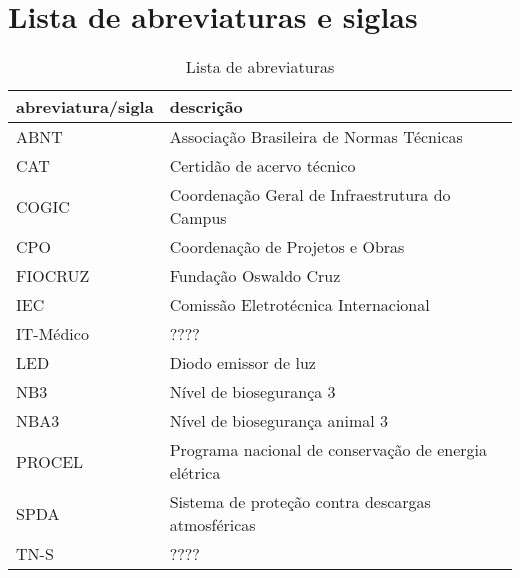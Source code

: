 \section*{Lista de abreviaturas e siglas} \label{section: abbreviations}

\begin{table}[ht]
\centering
\caption{Lista de abreviaturas}
\begin{tabular}[t]
{m{}m{}}
\toprule
\textbf{abreviatura/sigla}&\textbf{descrição}\\
\midrule
ABNT & Associação Brasileira de Normas Técnicas\\
CAT & Certidão de acervo técnico\\
COGIC & Coordenação Geral de Infraestrutura do Campus\\
CPO & Coordenação de Projetos e Obras\\
FIOCRUZ & Fundação Oswaldo Cruz\\
IEC & Comissão Eletrotécnica Internacional\\
IT-Médico & ????\\
LED & Diodo emissor de luz \\
NB3 & Nível de biosegurança 3\\
NBA3 & Nível de biosegurança animal 3\\
PROCEL & Programa nacional de conservação de energia elétrica\\
SPDA & Sistema de proteção contra descargas atmosféricas\\
TN-S & ????\\
\bottomrule
\end{tabular}
\end{table}